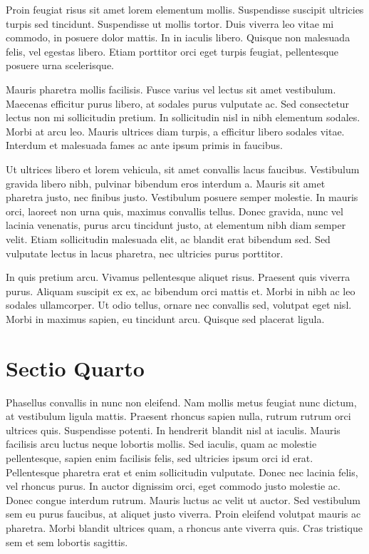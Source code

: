 Proin feugiat risus sit amet lorem elementum mollis. Suspendisse suscipit ultricies turpis sed tincidunt. Suspendisse ut mollis tortor. Duis viverra leo vitae mi commodo, in posuere dolor mattis. In in iaculis libero. Quisque non malesuada felis, vel egestas libero. Etiam porttitor orci eget turpis feugiat, pellentesque posuere urna scelerisque.

Mauris pharetra mollis facilisis. Fusce varius vel lectus sit amet vestibulum. Maecenas efficitur purus libero, at sodales purus vulputate ac. Sed consectetur lectus non mi sollicitudin pretium. In sollicitudin nisl in nibh elementum sodales. Morbi at arcu leo. Mauris ultrices diam turpis, a efficitur libero sodales vitae. Interdum et malesuada fames ac ante ipsum primis in faucibus.

Ut ultrices libero et lorem vehicula, sit amet convallis lacus faucibus. Vestibulum gravida libero nibh, pulvinar bibendum eros interdum a. Mauris sit amet pharetra justo, nec finibus justo. Vestibulum posuere semper molestie. In mauris orci, laoreet non urna quis, maximus convallis tellus. Donec gravida, nunc vel lacinia venenatis, purus arcu tincidunt justo, at elementum nibh diam semper velit. Etiam sollicitudin malesuada elit, ac blandit erat bibendum sed. Sed vulputate lectus in lacus pharetra, nec ultricies purus porttitor.

In quis pretium arcu. Vivamus pellentesque aliquet risus. Praesent quis viverra purus. Aliquam suscipit ex ex, ac bibendum orci mattis et. Morbi in nibh ac leo sodales ullamcorper. Ut odio tellus, ornare nec convallis sed, volutpat eget nisl. Morbi in maximus sapien, eu tincidunt arcu. Quisque sed placerat ligula.

\section{Sectio Quarto}
Phasellus convallis in nunc non eleifend. Nam mollis metus feugiat nunc dictum, at vestibulum ligula mattis. Praesent rhoncus sapien nulla, rutrum rutrum orci ultrices quis. Suspendisse potenti. In hendrerit blandit nisl at iaculis. Mauris facilisis arcu luctus neque lobortis mollis. Sed iaculis, quam ac molestie pellentesque, sapien enim facilisis felis, sed ultricies ipsum orci id erat. Pellentesque pharetra erat et enim sollicitudin vulputate. Donec nec lacinia felis, vel rhoncus purus. In auctor dignissim orci, eget commodo justo molestie ac. Donec congue interdum rutrum. Mauris luctus ac velit ut auctor. Sed vestibulum sem eu purus faucibus, at aliquet justo viverra. Proin eleifend volutpat mauris ac pharetra. Morbi blandit ultrices quam, a rhoncus ante viverra quis. Cras tristique sem et sem lobortis sagittis.

